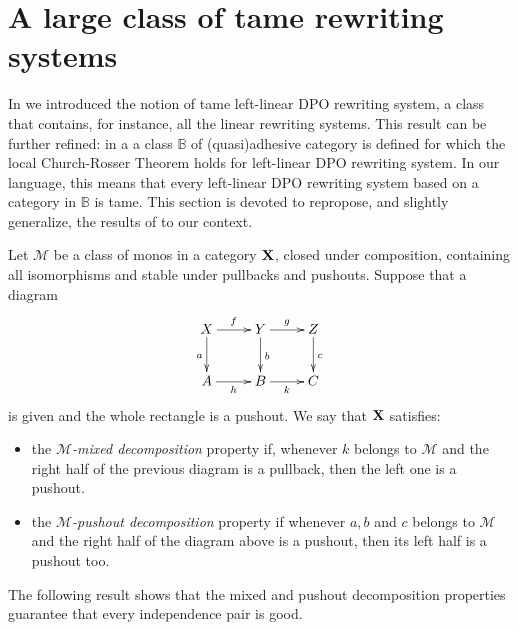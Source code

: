 \documentclass[a4paper,UKenglish,cleveref,pdftex, thm-restate,numberwithinsect]{lipics}
\def\X{\textbf {\textup{X}}}
\begin{document}
\section{A large class of tame rewriting systems}\label{app:fill}
 In  we introduced the notion of tame left-linear DPO rewriting system, a class that contains, for instance, all the linear rewriting systems. This result can be further refined: in a\cite{baldan2011adhesivity} a class  $\mathbb{B}$ of (quasi)adhesive category is defined for which the local Church-Rosser Theorem holds for left-linear DPO rewriting system. In our language, this means that every left-linear DPO rewriting system based on a category in $\mathbb{B}$ is tame. This section is devoted to repropose, and slightly generalize, the results of \cite{baldan2011adhesivity} to our context.

\begin{definition}Let $\mathcal{M}$ be a class of monos in a category $\X$, closed under composition, containing all isomorphisms and stable under pullbacks and pushouts. Suppose that a  diagram
	\[\xymatrix{X \ar[d]_{a} \ar[r]^{f}& \ar[r]^{g} Y \ar[d]^{b}& Z \ar[d]^{c}\\ A \ar[r]_{h}& B \ar[r]_{k}& C}\]
	is given and the whole rectangle is a pushout. We say that $\X$ satisfies:
	\begin{itemize}
		\item the \emph{$\mathcal{M}$-mixed decomposition} property if, whenever $k$ belongs to $\mathcal{M}$ and the right half of the previous diagram is a pullback, then the left one is a pushout.
		\item the \emph{$\mathcal{M}$-pushout decomposition} property if whenever $a, b$ and $c$ belongs to $\mathcal{M}$ and the right half of the diagram above is a pushout, then its left half is a pushout too.
	\end{itemize}
\end{definition}


The following result shows that the mixed and pushout decomposition properties guarantee that every independence pair is good.
\end{document}
